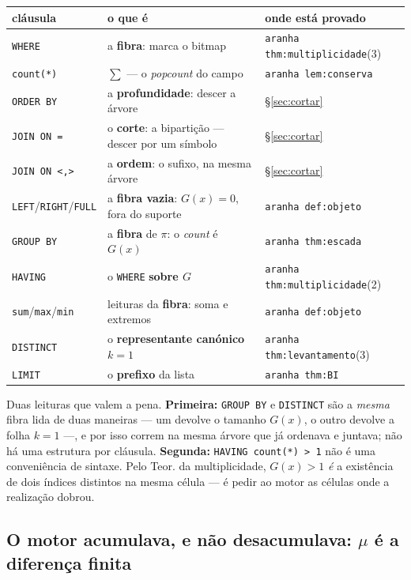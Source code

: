 \documentclass[11pt,a4paper]{article}
\newcommand{\code}[1]{\texttt{\small #1}}
\begin{document}
\begin{center}\small
\begin{tabular}{@{}lll@{}}
\toprule
cláusula & o que é & onde está provado \\
\midrule
\code{WHERE} & a \textbf{fibra}: marca o bitmap & \code{aranha thm:multiplicidade}(3) \\
\code{count(*)} & $\sum$ --- o \emph{popcount} do campo & \code{aranha lem:conserva} \\
\code{ORDER BY} & a \textbf{profundidade}: descer a árvore & §\ref{sec:cortar} \\
\code{JOIN ON =} & o \textbf{corte}: a bipartição --- descer por um símbolo & §\ref{sec:cortar} \\
\code{JOIN ON <,>} & a \textbf{ordem}: o sufixo, na mesma árvore & §\ref{sec:cortar} \\
\code{LEFT}/\code{RIGHT}/\code{FULL} & a \textbf{fibra vazia}: $G(x)=0$, fora do suporte & \code{aranha def:objeto} \\
\code{GROUP BY} & a \textbf{fibra} de $\pi$: o \emph{count} é $G(x)$ & \code{aranha thm:escada} \\
\code{HAVING} & o \code{WHERE} \textbf{sobre $G$} & \code{aranha thm:multiplicidade}(2) \\
\code{sum}/\code{max}/\code{min} & leituras da \textbf{fibra}: soma e extremos & \code{aranha def:objeto} \\
\code{DISTINCT} & o \textbf{representante canónico} $k=1$ & \code{aranha thm:levantamento}(3) \\
\code{LIMIT} & o \textbf{prefixo} da lista & \code{aranha thm:BI} \\
\bottomrule
\end{tabular}
\end{center}

\noindent Duas leituras que valem a pena. \textbf{Primeira:} \code{GROUP BY} e
\code{DISTINCT} são a \emph{mesma} fibra lida de duas maneiras --- um devolve o
tamanho $G(x)$, o outro devolve a folha $k=1$ ---, e por isso correm na mesma
árvore que já ordenava e juntava; não há uma estrutura por cláusula.
\textbf{Segunda:} \code{HAVING count(*) > 1} não é uma conveniência de sintaxe.
Pelo Teor. da multiplicidade, $G(x)>1$ \emph{é} a existência de dois índices
distintos na mesma célula --- é pedir ao motor as células onde a realização
dobrou.

\subsection*{O motor acumulava, e não desacumulava: $\mu$ é a diferença finita}
\end{document}
